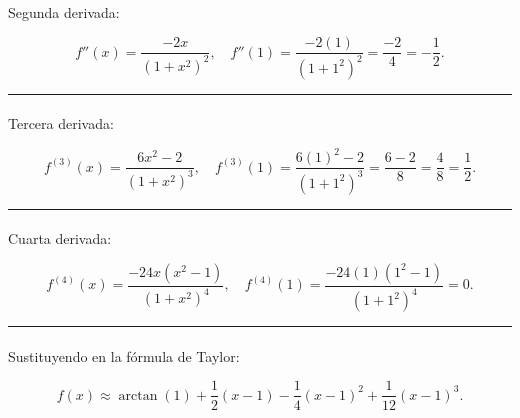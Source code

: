 \documentclass[
  letterpaper,
  DIV=11,
  numbers=noendperiod]{scrartcl}
\makeatletter
\let\oldparagraph\paragraph
\renewcommand{\paragraph}{
    \@ifstar
      \xxxParagraphStar
      \xxxParagraphNoStar
  }
\newcommand{\xxxParagraphStar}[1]{\oldparagraph*{#1}\mbox{}}
\newcommand{\xxxParagraphNoStar}[1]{\oldparagraph{#1}\mbox{}}
\makeatother
\begin{document}
\paragraph{Segunda derivada:}\label{segunda-derivada}

\[
f''(x) = \frac{-2x}{(1 + x^2)^2}, \quad f''(1) = \frac{-2(1)}{(1 + 1^2)^2} = \frac{-2}{4} = -\frac{1}{2}.
\]

\begin{center}\rule{0.5\linewidth}{0.5pt}\end{center}

\paragraph{Tercera derivada:}\label{tercera-derivada}

\[
f^{(3)}(x) = \frac{6x^2 - 2}{(1 + x^2)^3}, \quad f^{(3)}(1) = \frac{6(1)^2 - 2}{(1 + 1^2)^3} = \frac{6 - 2}{8} = \frac{4}{8} = \frac{1}{2}.
\]

\begin{center}\rule{0.5\linewidth}{0.5pt}\end{center}

\paragraph{Cuarta derivada:}\label{cuarta-derivada}

\[
f^{(4)}(x) = \frac{-24x(x^2 - 1)}{(1 + x^2)^4}, \quad f^{(4)}(1) = \frac{-24(1)(1^2 - 1)}{(1 + 1^2)^4} = 0.
\]

\begin{center}\rule{0.5\linewidth}{0.5pt}\end{center}

\paragraph{Sustituyendo en la fórmula de
Taylor:}\label{sustituyendo-en-la-fuxf3rmula-de-taylor}

\[
f(x) \approx \arctan(1) + \frac{1}{2}(x - 1) - \frac{1}{4}(x - 1)^2 + \frac{1}{12}(x - 1)^3.
\]
\end{document}
